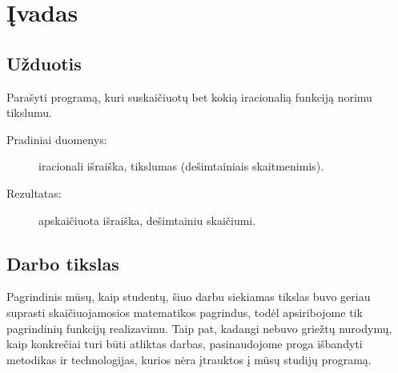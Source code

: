 \chapter{Įvadas}

\section{Užduotis}

Parašyti programą, kuri suskaičiuotų bet kokią iracionalią funkciją norimu
tikslumu.

\begin{description}
  \item[Pradiniai duomenys:] iracionali išraiška, tikslumas (dešimtainiais 
    skaitmenimis).
  \item[Rezultatas:] apskaičiuota išraiška, dešimtainiu skaičiumi.
\end{description}

\section{Darbo tikslas}

Pagrindinis mūsų, kaip studentų, šiuo darbu siekiamas tikslas buvo 
geriau suprasti skaičiuojamosios matematikos pagrindus, todėl 
apsiribojome tik pagrindinių funkcijų realizavimu. Taip pat,
kadangi nebuvo griežtų nurodymų, kaip konkrečiai turi būti atliktas
darbas, pasinaudojome proga išbandyti metodikas ir technologijas, kurios
nėra įtrauktos į mūsų studijų programą.
